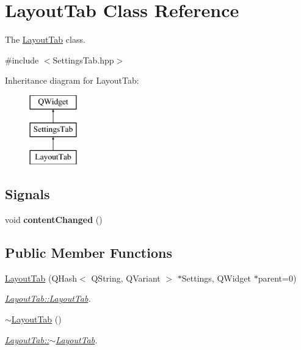 \hypertarget{classLayoutTab}{\section{Layout\+Tab Class Reference}
\label{classLayoutTab}
}


The \hyperlink{classLayoutTab}{Layout\+Tab} class.  




{\ttfamily \#include $<$Settings\+Tab.\+hpp$>$}

Inheritance diagram for Layout\+Tab\+:\begin{figure}[H]
\begin{center}
\leavevmode
\includegraphics[height=3.000000cm]{classLayoutTab}
\end{center}
\end{figure}
\subsection*{Signals}
\begin{DoxyCompactItemize}
\item 
\hypertarget{classSettingsTab_ab72744b5433a111f3e79da0ef1d9af74}{void {\bfseries content\+Changed} ()}\label{classSettingsTab_ab72744b5433a111f3e79da0ef1d9af74}

\end{DoxyCompactItemize}
\subsection*{Public Member Functions}
\begin{DoxyCompactItemize}
\item 
\hyperlink{classLayoutTab_ad7be4bcefe1444229216a91166d592dc}{Layout\+Tab} (Q\+Hash$<$ Q\+String, Q\+Variant $>$ $\ast$Settings, Q\+Widget $\ast$parent=0)
\begin{DoxyCompactList}\small\item\em \hyperlink{classLayoutTab_ad7be4bcefe1444229216a91166d592dc}{Layout\+Tab\+::\+Layout\+Tab}. \end{DoxyCompactList}\item 
\hyperlink{classLayoutTab_a9801cd1febbd7ce47aa9f0a5863596e9}{$\sim$\+Layout\+Tab} ()
\begin{DoxyCompactList}\small\item\em \hyperlink{classLayoutTab_a9801cd1febbd7ce47aa9f0a5863596e9}{Layout\+Tab\+::$\sim$\+Layout\+Tab}. \end{DoxyCompactList}\end{DoxyCompactItemize}
